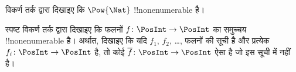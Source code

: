 \documentclass[../../../include/open-logic-section]{subfiles}
\begin{document}
\begin{prob}
विकर्ण तर्क द्वारा दिखाइए कि $\Pow{\Nat}$ !!{nonenumerable} है।
\end{prob}

\begin{prob}\label{sfr:siz:nen:prob:f-posint}
स्पष्ट विकर्ण तर्क द्वारा दिखाइए कि फलनों $f \colon \PosInt \to \PosInt$
का समुच्चय !!{nonenumerable} है। अर्थात, दिखाइए कि यदि $f_1$, $f_2$, \dots,
फलनों की सूची है और प्रत्येक $f_i\colon
\PosInt \to \PosInt$ है, तो कोई $\overline{f}\colon \PosInt \to
\PosInt$ ऐसा है जो इस सूची में नहीं है।
\end{prob}
\end{document}
